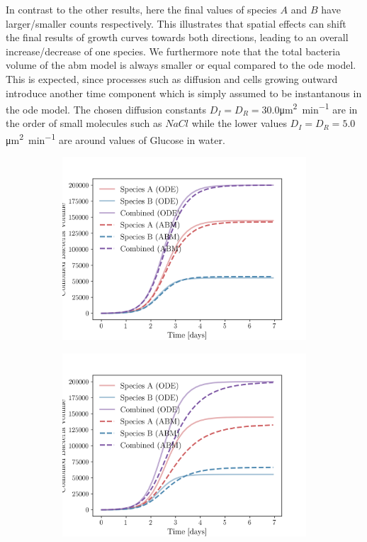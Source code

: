\documentclass[10pt,twocolumn,5p]{elsarticle}
\numberwithin{equation}{section}
\begin{document}
In contrast to the other results, here the final values of species $A$ and $B$ have larger/smaller counts respectively.
This illustrates that spatial effects can shift the final results of growth curves towards both directions, leading to an overall increase/decrease of one species.
We furthermore note that the total bacteria volume of the \ac{abm} model is always smaller or equal compared to the \ac{ode} model.
This is expected, since processes such as diffusion and cells growing outward introduce another time component which is simply assumed to be instantanous in the \ac{ode} model.
The chosen diffusion constants $D_I=D_R=30.0$\unit{\micro\metre\squared\per\minute} are in the order of small molecules such as $NaCl$ while the lower values $D_I=D_R=5.0$\unit{\micro\metre\squared\per\minute} are around values of Glucose in water.
\begin{figure}
    \centering
    \begin{subfigure}[c]{0.5\columnwidth}
        \includegraphics[width=\columnwidth]{Figures/abm-homogenous/abm_ode_comparison.png}
    \end{subfigure}%
    \begin{subfigure}[c]{0.5\columnwidth}
        \includegraphics[width=\columnwidth]{Figures/abm-homogenous-low-diffusion/abm_ode_comparison.png}

\end{subfigure}
\end{figure}
\end{document}
